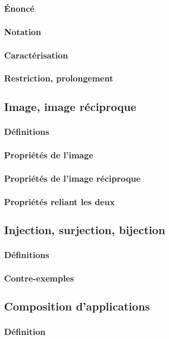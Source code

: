 \documentclass[12pt,a4paper,french]{book}
\begin{document}
			\subsubsection{Énoncé}
			\subsubsection{Notation}
			\subsubsection{Caractérisation}
			\subsubsection{Restriction, prolongement}
		\subsection{Image, image réciproque}
			\subsubsection{Définitions}
			\subsubsection{Propriétés de l'image}
			\subsubsection{Propriétés de l'image réciproque}
			\subsubsection{Propriétés reliant les deux}
		\subsection{Injection, surjection, bijection}
			\subsubsection{Définitions}
			\subsubsection{Contre-exemples}
		\subsection{Composition d'applications}
			\subsubsection{Définition}
\end{document}
